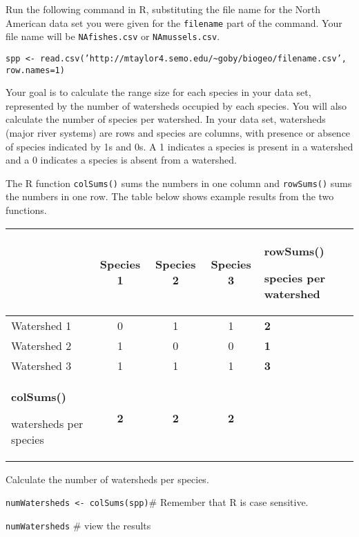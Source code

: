 \documentclass[11pt]{article}
\begin{document}
Run the following command in R, substituting the file name for the North American
data set you were given for the \texttt{filename} part of the command. Your file name 
will be \texttt{NAfishes.csv} or \texttt{NAmussels.csv}. 

\texttt{spp \textless{}-
read.csv('http://mtaylor4.semo.edu/\textasciitilde{}goby/biogeo/filename.csv', row.names=1)}

%

Your goal is to calculate the range size for each species in your
data set, represented by the number of watersheds occupied by each
species. You will also calculate the number of species per watershed. In your 
data set, watersheds (major river systems) are rows and species are columns, with presence or absence of
species indicated by 1s and 0s. A 1 indicates a species is present in a
watershed and a 0 indicates a species is absent from a watershed.

The R function \texttt{colSums()} sums the numbers in one column and \texttt{rowSums()} 
sums the numbers in one row. The table below shows example results from the 
two functions.

\label{tab:colrowsums}
\begin{longtable}[c]{@{}L{1.5in}cccC{1.5in}@{}}
\toprule
& Species 1 & Species 2 & Species 3 & \textbf{rowSums()}

species per watershed\tabularnewline
\midrule
\endhead
Watershed 1 & 0 & 1 & 1 & \textbf{2}\tabularnewline
Watershed 2 & 1 & 0 & 0 & \textbf{1}\tabularnewline
Watershed 3 & 1 & 1 & 1 & \textbf{3}\tabularnewline
\textbf{colSums()}

watersheds per species & \textbf{2} & \textbf{2} & \textbf{2}
&\tabularnewline
\bottomrule
\end{longtable}

Calculate the number of watersheds per species.

\texttt{numWatersheds \textless{}- colSums(spp)}\qquad \# Remember that R is case
sensitive.

\texttt{numWatersheds} \qquad \# view the results
\end{document}
